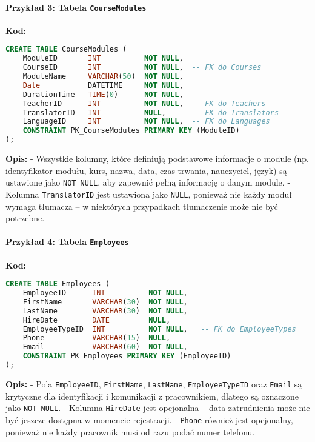 \documentclass[12pt]{article}
\begin{document}
\paragraph{Przykład 3: Tabela \texttt{CourseModules}}  
\textbf{Kod:}
\begin{lstlisting}[language=SQL]
CREATE TABLE CourseModules (
    ModuleID       INT          NOT NULL,
    CourseID       INT          NOT NULL,  -- FK do Courses
    ModuleName     VARCHAR(50)  NOT NULL,
    Date           DATETIME     NOT NULL,
    DurationTime   TIME(0)      NOT NULL,
    TeacherID      INT          NOT NULL,  -- FK do Teachers
    TranslatorID   INT          NULL,      -- FK do Translators
    LanguageID     INT          NOT NULL,  -- FK do Languages
    CONSTRAINT PK_CourseModules PRIMARY KEY (ModuleID)
);
\end{lstlisting}
\textbf{Opis:}  
- Wszystkie kolumny, które definiują podstawowe informacje o module (np. identyfikator modułu, kurs, nazwa, data, czas trwania, nauczyciel, język) są ustawione jako \texttt{NOT NULL}, aby zapewnić pełną informację o danym module.
- Kolumna \texttt{TranslatorID} jest ustawiona jako \texttt{NULL}, ponieważ nie każdy moduł wymaga tłumacza – w niektórych przypadkach tłumaczenie może nie być potrzebne.

\paragraph{Przykład 4: Tabela \texttt{Employees}}  
\textbf{Kod:}
\begin{lstlisting}[language=SQL]
CREATE TABLE Employees (
    EmployeeID      INT          NOT NULL,
    FirstName       VARCHAR(30)  NOT NULL,
    LastName        VARCHAR(30)  NOT NULL,
    HireDate        DATE         NULL,
    EmployeeTypeID  INT          NOT NULL,   -- FK do EmployeeTypes
    Phone           VARCHAR(15)  NULL,
    Email           VARCHAR(60)  NOT NULL,
    CONSTRAINT PK_Employees PRIMARY KEY (EmployeeID)
);
\end{lstlisting}
\textbf{Opis:}  
- Pola \texttt{EmployeeID}, \texttt{FirstName}, \texttt{LastName}, \texttt{EmployeeTypeID} oraz \texttt{Email} są krytyczne dla identyfikacji i komunikacji z pracownikiem, dlatego są oznaczone jako \texttt{NOT NULL}.
- Kolumna \texttt{HireDate} jest opcjonalna – data zatrudnienia może nie być jeszcze dostępna w momencie rejestracji.
- \texttt{Phone} również jest opcjonalny, ponieważ nie każdy pracownik musi od razu podać numer telefonu.

\newpage
\end{document}
